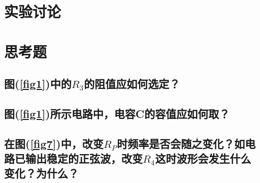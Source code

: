 \documentclass[a4paper]{article}
\begin{document}
\section{实验讨论}

\section{思考题}
\subsection{图(\ref{fig1})中的$R_3$的阻值应如何选定？}
\subsection{图(\ref{fig1})所示电路中，电容C的容值应如何取？}
\subsection{在图(\ref{fig7})中，改变$R_P$时频率是否会随之变化？如电路已输出稳定的正弦波，改变$R_4$这时波形会发生什么变化？为什么？}

\nocite{jiaocai}

\end{document}
